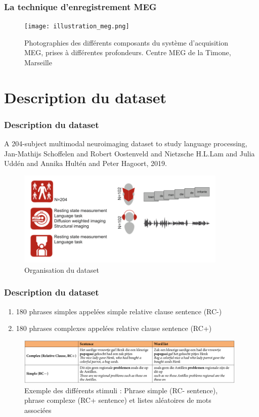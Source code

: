 \documentclass{beamer}
\begin{document}
\begin{frame}
\frametitle{La technique d'enregistrement MEG}
\begin{figure}[!ht]
    \centering
    \texttt{[image: illustration\_meg.png]}
    \caption{Photographies des différents composants du système d'acquisition MEG, prises à différentes profondeurs. Centre MEG de la Timone, Marseille}
    \label{fig1.3}
\end{figure}
\end{frame}

\section{Description du dataset}
\begin{frame}
\frametitle{Description du dataset}
A 204-subject multimodal neuroimaging dataset to study language processing, Jan-Mathijs Schoffelen and Robert Oostenveld and Nietzsche H.L.Lam and Julia Uddén and Annika Hultén and Peter Hagoort, 2019.
\begin{figure}[!ht]
    \centering
    \includegraphics[width=10cm]{orga_dataset.png}
    \caption{Organisation du dataset}
    \label{fig2.1}
\end{figure}
\end{frame}

\begin{frame}
\frametitle{Description du dataset}
\begin{enumerate}
    \item 180 phrases simples appelées simple relative clause sentence (RC-)
    \item 180 phrases complexes appelées relative clause sentence (RC+)
\end{enumerate}
\begin{figure}[!ht]
    \centering
    \includegraphics[width=11cm]{stimuli.png}
    \caption{Exemple des différents stimuli : Phrase simple (RC- sentence), phrase complexe (RC+ sentence) et listes aléatoires de mots associées}
    \label{fig2.2}
\end{figure}
\end{frame}
\end{document}
